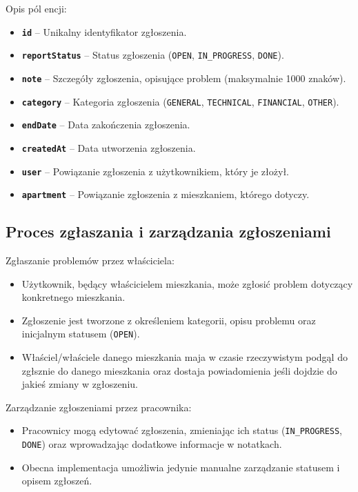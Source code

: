 Opis pól encji:
\begin{itemize}
    \item \textbf{\texttt{id}} -- Unikalny identyfikator zgłoszenia.
    \item \textbf{\texttt{reportStatus}} -- Status zgłoszenia (\texttt{OPEN}, \texttt{IN\_PROGRESS}, \texttt{DONE}).
    \item \textbf{\texttt{note}} -- Szczegóły zgłoszenia, opisujące problem (maksymalnie 1000 znaków).
    \item \textbf{\texttt{category}} -- Kategoria zgłoszenia (\texttt{GENERAL}, \texttt{TECHNICAL}, \texttt{FINANCIAL}, \texttt{OTHER}).
    \item \textbf{\texttt{endDate}} -- Data zakończenia zgłoszenia.
    \item \textbf{\texttt{createdAt}} -- Data utworzenia zgłoszenia.
    \item \textbf{\texttt{user}} -- Powiązanie zgłoszenia z użytkownikiem, który je złożył.
    \item \textbf{\texttt{apartment}} -- Powiązanie zgłoszenia z mieszkaniem, którego dotyczy.
\end{itemize}

\subsection{Proces zgłaszania i zarządzania zgłoszeniami}

Zgłaszanie problemów przez właściciela:
\begin{itemize}
    \item Użytkownik, będący właścicielem mieszkania, może zgłosić problem dotyczący konkretnego mieszkania. 
    \item Zgłoszenie jest tworzone z określeniem kategorii, opisu problemu oraz inicjalnym statusem (\texttt{OPEN}).
		\item Właściel/właściele danego mieszkania maja w czasie rzeczywistym podgąl do zgłsznie do danego mieszkania oraz dostaja powiadomienia jeśli dojdzie  do jakieś zmiany w zgłoszeniu.
\end{itemize}

Zarządzanie zgłoszeniami przez pracownika:
\begin{itemize}
    \item Pracownicy mogą edytować zgłoszenia, zmieniając ich status (\texttt{IN\_PROGRESS}, \texttt{DONE}) oraz wprowadzając dodatkowe informacje w notatkach.
    \item Obecna implementacja umożliwia jedynie manualne zarządzanie statusem i opisem zgłoszeń.
\end{itemize}

